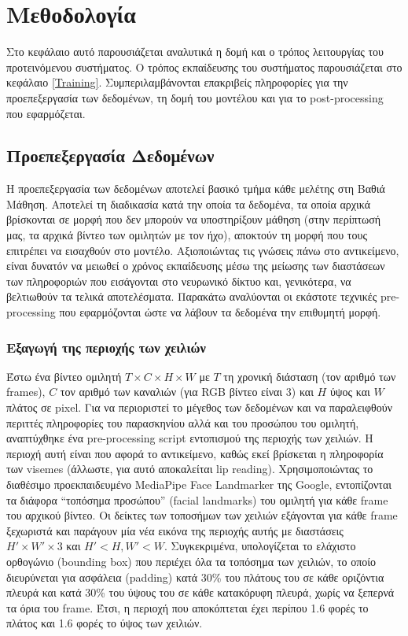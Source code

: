 \section{Μεθοδολογία}
\label{Methodology}

Στο κεφάλαιο αυτό παρουσιάζεται αναλυτικά η δομή και ο τρόπος λειτουργίας του προτεινόμενου συστήματος. Ο τρόπος εκπαίδευσης του συστήματος παρουσιάζεται στο κεφάλαιο \ref{Training}. Συμπεριλαμβάνονται επακριβείς πληροφορίες για την προεπεξεργασία των δεδομένων, τη δομή του μοντέλου και για το post-processing που εφαρμόζεται.

\subsection{Προεπεξεργασία Δεδομένων}
\label{DataPreprocessing}

Η προεπεξεργασία των δεδομένων αποτελεί βασικό τμήμα κάθε μελέτης στη Βαθιά Μάθηση. Αποτελεί τη διαδικασία κατά την οποία τα δεδομένα, τα οποία αρχικά βρίσκονται σε μορφή που δεν μπορούν να υποστηρίξουν μάθηση (στην περίπτωσή μας, τα αρχικά βίντεο των ομιλητών με τον ήχο), αποκτούν τη μορφή που τους επιτρέπει να εισαχθούν στο μοντέλο. Αξιοποιώντας τις γνώσεις πάνω στο αντικείμενο, είναι δυνατόν να μειωθεί ο χρόνος εκπαίδευσης μέσω της μείωσης των διαστάσεων των πληροφοριών που εισάγονται στο νευρωνικό δίκτυο και, γενικότερα, να βελτιωθούν τα τελικά αποτελέσματα. Παρακάτω αναλύονται οι εκάστοτε τεχνικές pre-processing που εφαρμόζονται ώστε να λάβουν τα δεδομένα την επιθυμητή μορφή.

\subsubsection{Εξαγωγή της περιοχής των χειλιών}
\label{LipExtraction}
Έστω ένα βίντεο ομιλητή $T \times C \times H \times W$ με $T$ τη χρονική διάσταση (τον αριθμό των frames), $C$ τον αριθμό των καναλιών (για RGB βίντεο είναι 3) και $H$ ύψος και $W$ πλάτος σε pixel. Για να περιοριστεί το μέγεθος των δεδομένων και να παραλειφθούν περιττές πληροφορίες του παρασκηνίου αλλά και του προσώπου του ομιλητή, αναπτύχθηκε ένα pre-processing script εντοπισμού της περιοχής των χειλιών. Η περιοχή αυτή είναι που αφορά το αντικείμενο, καθώς εκεί βρίσκεται η πληροφορία των visemes (άλλωστε, για αυτό αποκαλείται lip reading). Χρησιμοποιώντας το διαθέσιμο προεκπαιδευμένο MediaPipe Face Landmarker της Google, εντοπίζονται τα διάφορα ``τοπόσημα προσώπου'' (facial landmarks) του ομιλητή για κάθε frame του αρχικού βίντεο. Οι δείκτες των τοποσήμων των χειλιών εξάγονται για κάθε frame ξεχωριστά και παράγουν μία νέα εικόνα της περιοχής αυτής με διαστάσεις $H' \times W' \times 3$ και $H'<H, W'<W$. Συγκεκριμένα, υπολογίζεται το ελάχιστο ορθογώνιο (bounding box) που περιέχει όλα τα τοπόσημα των χειλιών, το οποίο διευρύνεται για ασφάλεια (padding) κατά 30\% του πλάτους του σε κάθε οριζόντια πλευρά και κατά 30\% του ύψους του σε κάθε κατακόρυφη πλευρά, χωρίς να ξεπερνά τα όρια του frame. Έτσι, η περιοχή που αποκόπτεται έχει περίπου 1.6 φορές το πλάτος και 1.6 φορές το ύψος των χειλιών.

